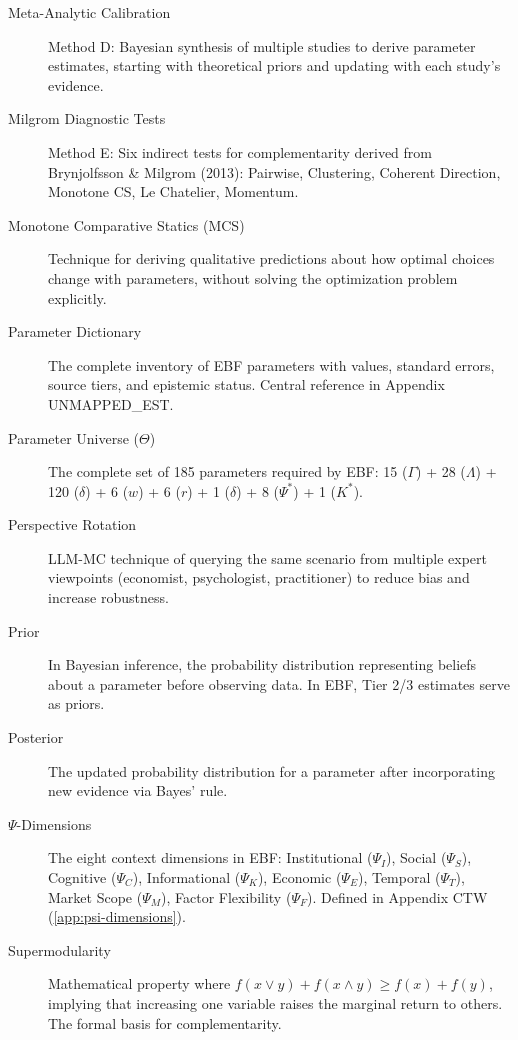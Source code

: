 \documentclass[11pt,a4paper]{article}
\theoremstyle{definition}
\begin{document}
\begin{description}
\item[Meta-Analytic Calibration]
Method D: Bayesian synthesis of multiple studies to derive parameter estimates, 
starting with theoretical priors and updating with each study's evidence.

\item[Milgrom Diagnostic Tests]
Method E: Six indirect tests for complementarity derived from 
Brynjolfsson \& Milgrom (2013): Pairwise, Clustering, Coherent Direction, 
Monotone CS, Le Chatelier, Momentum.

\item[Monotone Comparative Statics (MCS)]
Technique for deriving qualitative predictions about how optimal choices 
change with parameters, without solving the optimization problem explicitly.

\item[Parameter Dictionary]
The complete inventory of EBF parameters with values, standard errors, 
source tiers, and epistemic status. Central reference in Appendix UNMAPPED_EST.

\item[Parameter Universe ($\Theta$)]
The complete set of 185 parameters required by EBF: 15 ($\Gamma$) + 28 ($\Lambda$) 
+ 120 ($\delta$) + 6 ($w$) + 6 ($r$) + 1 ($\delta$) + 8 ($\Psi^*$) + 1 ($K^*$).

\item[Perspective Rotation]
LLM-MC technique of querying the same scenario from multiple expert viewpoints 
(economist, psychologist, practitioner) to reduce bias and increase robustness.

\item[Prior]
In Bayesian inference, the probability distribution representing beliefs about 
a parameter before observing data. In EBF, Tier 2/3 estimates serve as priors.

\item[Posterior]
The updated probability distribution for a parameter after incorporating new 
evidence via Bayes' rule.

\item[$\Psi$-Dimensions]
The eight context dimensions in EBF: Institutional ($\Psi_I$), Social ($\Psi_S$), 
Cognitive ($\Psi_C$), Informational ($\Psi_K$), Economic ($\Psi_E$), Temporal ($\Psi_T$), 
Market Scope ($\Psi_M$), Factor Flexibility ($\Psi_F$). Defined in Appendix CTW (\ref{app:psi-dimensions}).

\item[Supermodularity]
Mathematical property where $f(x \vee y) + f(x \wedge y) \geq f(x) + f(y)$, 
implying that increasing one variable raises the marginal return to others. 
The formal basis for complementarity.


\end{description}
\end{document}

